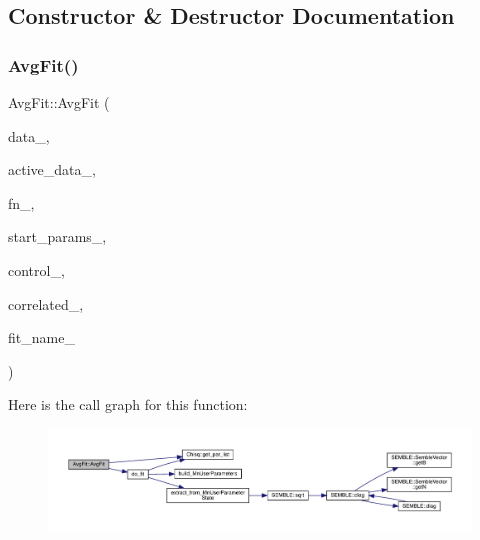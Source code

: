 \subsection{Constructor \& Destructor Documentation}
\mbox{\label{classAvgFit_a578a5426ad4b8bf8caea1dad68b014ac}} 
\subsubsection{\texorpdfstring{AvgFit()}{AvgFit()}\hspace{0.1cm}{\footnotesize\ttfamily [1/2]}}
{\footnotesize\ttfamily Avg\+Fit\+::\+Avg\+Fit (\begin{DoxyParamCaption}\item[{const \mbox{\hyperlink{classData}{Data}} \&}]{data\+\_\+,  }\item[{const vector$<$ bool $>$ \&}]{active\+\_\+data\+\_\+,  }\item[{\mbox{\hyperlink{classFunction}{Function}} $\ast$}]{fn\+\_\+,  }\item[{const map$<$ string, \mbox{\hyperlink{structparam__value}{param\+\_\+value}} $>$ \&}]{start\+\_\+params\+\_\+,  }\item[{const \mbox{\hyperlink{structMinuitControl}{Minuit\+Control}} \&}]{control\+\_\+,  }\item[{bool}]{correlated\+\_\+,  }\item[{string}]{fit\+\_\+name\+\_\+ }\end{DoxyParamCaption})}

Here is the call graph for this function\+:
\nopagebreak
\begin{figure}[H]
\begin{center}
\leavevmode
\includegraphics[width=350pt]{d4/dfd/classAvgFit_a578a5426ad4b8bf8caea1dad68b014ac_cgraph}
\end{center}
\end{figure}
\mbox{\label{classAvgFit_a578a5426ad4b8bf8caea1dad68b014ac}} 
